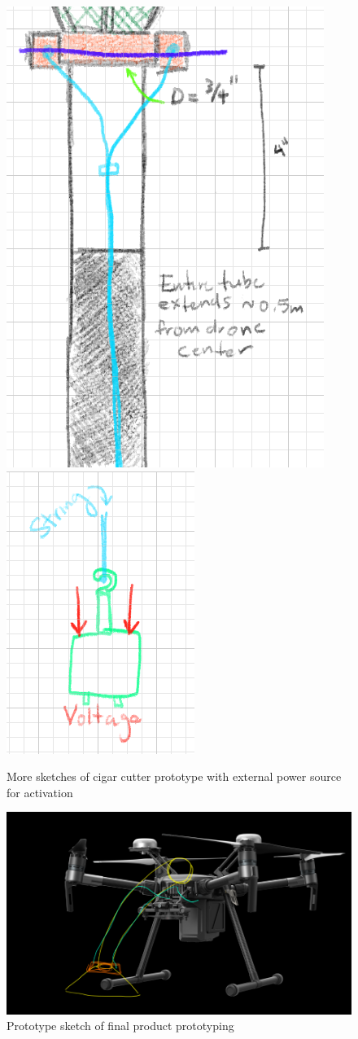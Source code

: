 \documentclass{wrcecapstone}
\begin{document}
\begin{figure}
\begin{center}
\includegraphics[width=0.49\columnwidth]{figures/fig738a.png}
\includegraphics[width=0.49\columnwidth]{figures/fig738b.png}
\end{center}
\caption{More sketches of cigar cutter prototype with external power source for activation}
\label{fig:7.3.8}
\end{figure}
\begin{figure}
\begin{center}
\includegraphics[width=\columnwidth]{figures/fig739.png}
\end{center}
\caption{Prototype sketch of final product prototyping}
\label{fig:7.3.9}
\end{figure}
\end{document}
